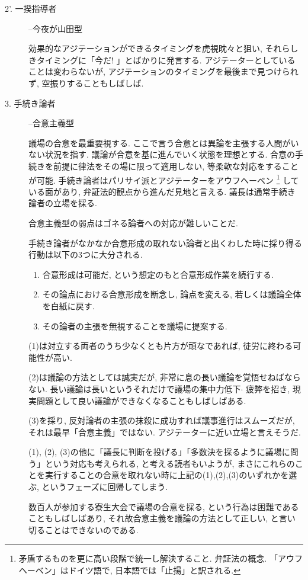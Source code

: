 \documentclass[10pt,b5jsbook,dvips,dvipdfmx,openany]{jsbook}
\theoremstyle{definition}
\begin{document}
\begin{description}
			\item[2'. 一揆指導者] --今夜が山田型

			効果的なアジテーションができるタイミングを虎視眈々と狙い, それらしきタイミングに「今だ! 」とばかりに発言する. アジテーターとしていることは変わらないが, アジテーションのタイミングを最後まで見つけられず, 空振りすることもしばしば.

			\item[3. 手続き論者] --合意主義型

			議場の合意を最重要視する. ここで言う合意とは異論を主張する人間がいない状況を指す. 議論が合意を基に進んでいく状態を理想とする. 合意の手続きを前提に律法をその場に限って適用しない, 等柔軟な対応をすることが可能. 手続き論者はパリサイ派とアジテーターをアウフヘーベン \footnote{矛盾するものを更に高い段階で統一し解決すること. 弁証法の概念. 「アウフヘーベン」はドイツ語で, 日本語では「止揚」と訳される. } している面があり, 弁証法的観点から進んだ見地と言える. 議長は通常手続き論者の立場を採る.

			合意主義型の弱点はゴネる論者への対応が難しいことだ.

			手続き論者がなかなか合意形成の取れない論者と出くわした時に採り得る行動は以下の3つに大分される.

			\begin{tcolorbox}

			\begin{enumerate}

			\item 合意形成は可能だ, という想定のもと合意形成作業を続行する.
			\item その論点における合意形成を断念し, 論点を変える, 若しくは議論全体を白紙に戻す.
			\item その論者の主張を無視することを議場に提案する.

			\end{enumerate}

			\end{tcolorbox}
			(1)は対立する両者のうち少なくとも片方が頑なであれば, 徒労に終わる可能性が高い.

			(2)は議論の方法としては誠実だが, 非常に息の長い議論を覚悟せねばならない. 長い議論は長いというそれだけで議場の集中力低下$ \cdot $ 疲弊を招き, 現実問題として良い議論ができなくなることもしばしばある.

			(3)を採り, 反対論者の主張の抹殺に成功すれば議事進行はスムーズだが, それは最早「合意主義」ではない. アジテーターに近い立場と言えそうだ.

			(1), (2), (3)の他に「議長に判断を投げる」「多数決を採るように議場に問う」という対応も考えられる, と考える読者もいようが, まさにこれらのことを実行することの合意を取れない時に上記の(1),(2),(3)のいずれかを選ぶ, というフェーズに回帰してしまう.

			数百人が参加する寮生大会で議場の合意を採る, という行為は困難であることもしばしばあり, それ故合意主義を議論の方法として正しい, と言い切ることはできないのである.

			\end{description}
\end{document}
